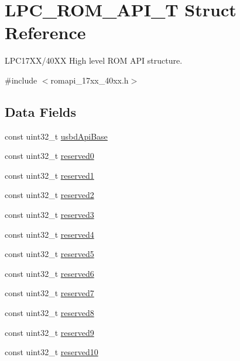 \hypertarget{structLPC__ROM__API__T}{\section{L\-P\-C\-\_\-\-R\-O\-M\-\_\-\-A\-P\-I\-\_\-\-T Struct Reference}
\label{structLPC__ROM__API__T}
}


L\-P\-C17\-X\-X/40\-X\-X High level R\-O\-M A\-P\-I structure.  




{\ttfamily \#include $<$romapi\-\_\-17xx\-\_\-40xx.\-h$>$}

\subsection*{Data Fields}
\begin{DoxyCompactItemize}
\item 
const uint32\-\_\-t \hyperlink{structLPC__ROM__API__T_a94bc8146ba697eeadc992d4985971550}{usbd\-Api\-Base}
\item 
const uint32\-\_\-t \hyperlink{structLPC__ROM__API__T_a93487c5be9000ba3b633bd6c354f8589}{reserved0}
\item 
const uint32\-\_\-t \hyperlink{structLPC__ROM__API__T_a2fce9202473b5986d54262b3d5548e82}{reserved1}
\item 
const uint32\-\_\-t \hyperlink{structLPC__ROM__API__T_a0ab9f56adf03f0f69b04baa60bcc271a}{reserved2}
\item 
const uint32\-\_\-t \hyperlink{structLPC__ROM__API__T_a70c7b14958f6d5af166224d04148e945}{reserved3}
\item 
const uint32\-\_\-t \hyperlink{structLPC__ROM__API__T_a1d3193c8ed079cf1c5006dce51686598}{reserved4}
\item 
const uint32\-\_\-t \hyperlink{structLPC__ROM__API__T_a1e6687c757f30d286d1ae661c0863026}{reserved5}
\item 
const uint32\-\_\-t \hyperlink{structLPC__ROM__API__T_a425b87f3b0f5ce258583e9e965829606}{reserved6}
\item 
const uint32\-\_\-t \hyperlink{structLPC__ROM__API__T_a7a9d7f0aa59c70ff085c59291594d22c}{reserved7}
\item 
const uint32\-\_\-t \hyperlink{structLPC__ROM__API__T_a81674fc569de19c3dd861c1f87df1d44}{reserved8}
\item 
const uint32\-\_\-t \hyperlink{structLPC__ROM__API__T_aae524e6f969485072d45b577c7501abc}{reserved9}
\item 
const uint32\-\_\-t \hyperlink{structLPC__ROM__API__T_afb1226faead704ffe1e0c7c5efcb86f2}{reserved10}
\end{DoxyCompactItemize}


